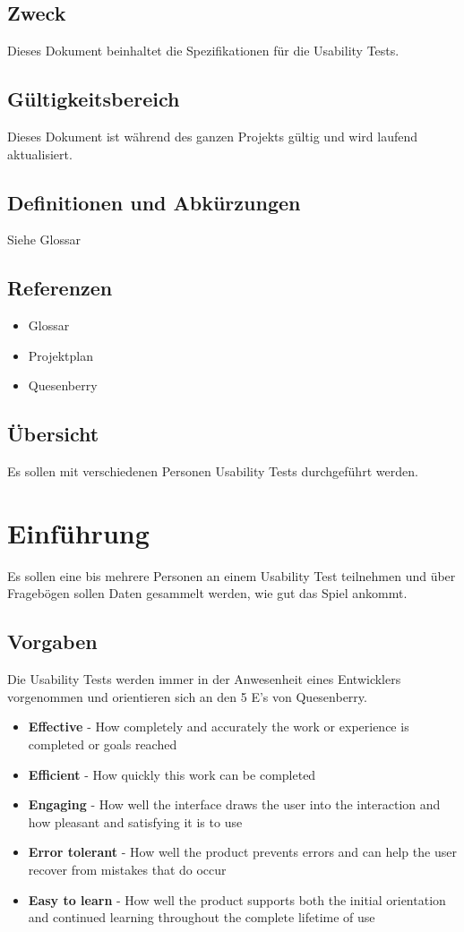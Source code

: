 \documentclass[11pt]{scrartcl}
\begin{document}
\subsection{Zweck}
Dieses Dokument beinhaltet die Spezifikationen für die Usability Tests.
\subsection{Gültigkeitsbereich}
Dieses Dokument ist während des ganzen Projekts gültig und wird laufend aktualisiert.
\subsection{Definitionen und Abkürzungen}
Siehe Glossar
\subsection{Referenzen}
\begin{itemize}
  \item Glossar
  \item Projektplan
  \item Quesenberry
\end{itemize}
\subsection{Übersicht}
Es sollen mit verschiedenen Personen Usability Tests durchgeführt werden.

\section{Einführung}
Es sollen eine bis mehrere Personen an einem Usability Test teilnehmen und über 
Fragebögen sollen Daten gesammelt werden, wie gut das Spiel ankommt.

\subsection{Vorgaben}
Die Usability Tests werden immer in der Anwesenheit eines Entwicklers 
vorgenommen und orientieren sich an den 5 E's von Quesenberry.
\begin{itemize}
  \item \textbf{Effective} - How completely and accurately the work or experience 
  is completed or goals reached
  \item \textbf{Efficient} - How quickly this work can be completed
  \item \textbf{Engaging} - How well the interface draws the user into the 
  interaction and how pleasant and satisfying it is to use
  \item \textbf{Error tolerant} - How well the product prevents errors and can help the 
  user recover from mistakes that do occur
  \item \textbf{Easy to learn} - How well the product supports both the initial orientation and continued 
  learning throughout the complete lifetime of use
\end{itemize}
\end{document}
